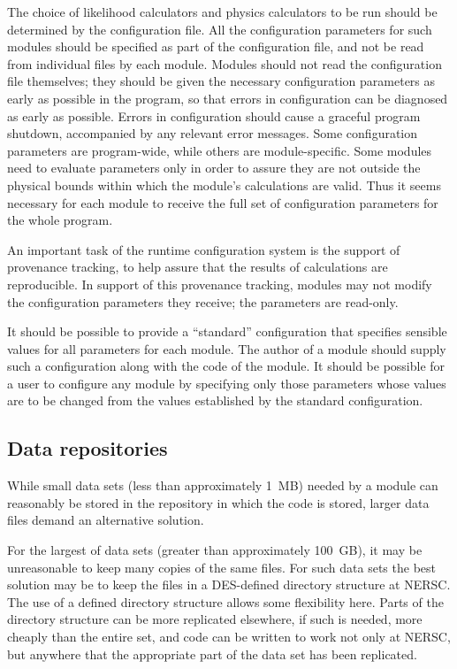 \documentclass{memarticle}
\begin{document}
The choice of likelihood calculators and physics calculators to be run
should be determined by the configuration file. All the configuration
parameters for such modules should be specified as part of the
configuration file, and not be read from individual files by each
module. Modules should not read the configuration file themselves; they
should be given the necessary configuration parameters as early as
possible in the program, so that errors in configuration can be
diagnosed as early as possible. Errors in configuration should cause a
graceful program shutdown, accompanied by any relevant error messages.
Some configuration parameters are program-wide, while others are
module-specific. Some modules need to evaluate parameters only in order
to assure they are not outside the physical bounds within which the
module's calculations are valid. Thus it seems necessary for each module
to receive the full set of configuration parameters for the whole
program.

An important task of the runtime configuration system is the support of
provenance tracking, to help assure that the results of calculations are
reproducible. In support of this provenance tracking, modules may not
modify the configuration parameters they receive; the parameters are
read-only.

It should be possible to provide a ``standard'' configuration that
specifies sensible values for all parameters for each module. The author
of a module should supply such a configuration along with the code of
the module. It should be possible for a user to configure any module by
specifying only those parameters whose values are to be changed from the
values established by the standard configuration.

\subsection{Data repositories}

While small data sets (less than approximately 1~MB) needed by a module can
reasonably be stored in the repository in which the code is stored,
larger data files demand an alternative solution.

For the largest of data sets (greater than approximately 100~GB), it may
be unreasonable to keep many copies of the same files. For such data
sets the best solution may be to keep the files in a DES-defined
directory structure at NERSC. The use of a defined directory structure
allows some flexibility here. Parts of the directory structure can be
more replicated elsewhere, if such is needed, more cheaply than the
entire set, and code can be written to work not only at NERSC, but
anywhere that the appropriate part of the data set has been replicated.
\end{document}
